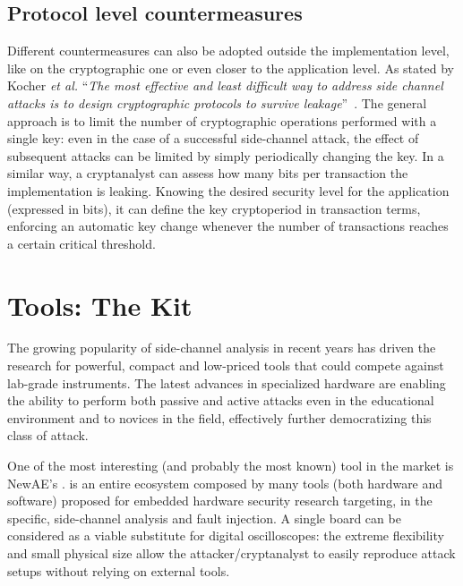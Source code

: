         \subsection{Protocol level countermeasures}
            Different countermeasures can also be adopted outside the implementation level, like on the cryptographic one or even closer to the application level. As stated by Kocher \emph{et al.} ``\emph{The most effective and least difficult way to address side channel attacks is to design cryptographic protocols to survive leakage}''~\cite{kocher2011introduction}. The general approach is to limit the number of cryptographic operations performed with a single key: even in the case of a successful side-channel attack, the effect of subsequent attacks can be limited by simply periodically changing the key. In a similar way, a cryptanalyst can assess how many bits per transaction the implementation is leaking. Knowing the desired security level for the application (expressed in bits), it can define the key cryptoperiod in transaction terms, enforcing an automatic key change whenever the number of transactions reaches a certain critical threshold.


\newpage

    \section{Tools: The \cw{} Kit}\label{sec:cw}
        The growing popularity of side-channel analysis in recent years has driven the research for powerful, compact and low-priced tools that could compete against lab-grade instruments. The latest advances in specialized hardware are enabling the ability to perform both passive and active attacks even in the educational environment and to novices in the field, effectively further democratizing this class of attack. 

        One of the most interesting (and probably the most known) tool in the market is NewAE's \cw{}. \cw{} is an entire ecosystem composed by many tools (both hardware and software) proposed for embedded hardware security research targeting, in the specific, side-channel analysis and fault injection. A single \cw{} board can be considered as a viable substitute for digital oscilloscopes: the extreme flexibility and small physical size allow the attacker/cryptanalyst to easily reproduce attack setups without relying on external tools.

